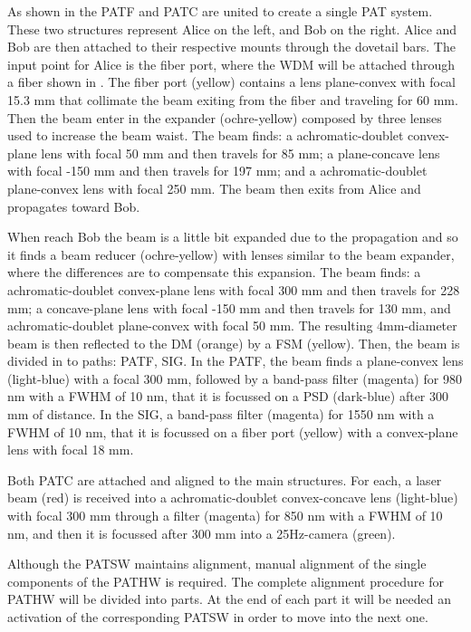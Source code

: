 
As shown in the  PATF and PATC are united to create a single PAT system. These two structures represent Alice on the left, and Bob on the right. Alice and Bob are then attached to their respective mounts through the dovetail bars.
The input point for Alice is the fiber port, where the WDM will be attached through a fiber shown in . The fiber port (yellow) contains a lens plane-convex with focal 15.3 mm that collimate the beam exiting from the fiber and traveling for 60 mm. Then the beam enter in the expander (ochre-yellow) composed by three lenses used to increase the beam waist. The beam finds: a achromatic-doublet convex-plane lens with focal 50 mm and then travels for 85 mm; a plane-concave lens with focal -150 mm and then travels for 197 mm; and a achromatic-doublet plane-convex lens with focal 250 mm. The beam then exits from Alice and propagates toward Bob.

When reach Bob the beam is a little bit expanded due to the propagation and so it finds a beam reducer (ochre-yellow) with lenses similar to the beam expander, where the differences are to compensate this expansion. The beam finds: a achromatic-doublet convex-plane lens with focal 300 mm and then travels for 228 mm; a concave-plane lens with focal -150 mm and then travels for 130 mm, and achromatic-doublet plane-convex with focal 50 mm. The resulting 4mm-diameter beam is then reflected to the DM (orange) by a FSM (yellow). Then, the beam is divided in to paths: PATF, SIG.
In the PATF, the beam finds a plane-convex lens (light-blue) with a focal 300 mm, followed by a band-pass filter (magenta) for 980 nm with a FWHM of 10 nm, that it is focussed on a PSD (dark-blue) after 300 mm of distance.
In the SIG, a band-pass filter (magenta) for 1550 nm with a FWHM of 10 nm, that it is focussed on a fiber port (yellow) with a convex-plane lens with focal 18 mm.

Both PATC are attached and aligned to the main structures. For each, a laser beam (red) is received into a achromatic-doublet convex-concave lens (light-blue) with focal 300 mm through a filter (magenta) for 850 nm with a FWHM of 10 nm, and then it is focussed after 300 mm into a 25Hz-camera (green).

Although the PATSW maintains alignment, manual alignment of the single components of the PATHW is required.
The complete alignment procedure for PATHW will be divided into parts. At the end of each part it will be needed an activation of the corresponding PATSW in order to move into the next one.

